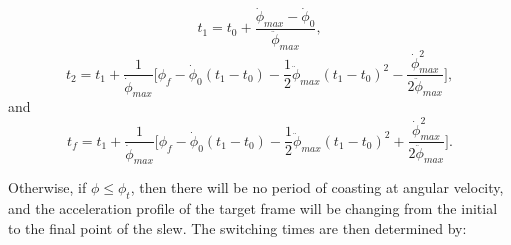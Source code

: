 \documentclass[journal ]{new-aiaa}
\begin{document}
\begin{equation}\label{t1cons}
t_1=t_0+\frac{\dot{\phi}_{max}-\dot{\phi}_0}{\ddot{\phi}_{max}},
\end{equation}
\begin{equation}\label{t2cons}
t_2=t_1+\frac{1}{\dot{\phi}_{max}}\Big[ \phi_f-\dot{\phi}_0(t_1-t_0)-\frac{1}{2}\ddot{\phi}_{max}(t_1-t_0)^2-\frac{\dot{\phi}_{max}^2}{2\ddot{\phi}_{max}} \Big],
\end{equation}
and
\begin{equation}\label{tfcons}
t_f=t_1+\frac{1}{\dot{\phi}_{max}}\Big[ \phi_f-\dot{\phi}_0(t_1-t_0)-\frac{1}{2}\ddot{\phi}_{max}(t_1-t_0)^2+\frac{\dot{\phi}_{max}^2}{2\ddot{\phi}_{max}} \Big].
\end{equation}

Otherwise, if $\phi \leq \phi_t$, then there will be no period of coasting at angular velocity, and the acceleration profile of the target frame will be changing from the initial to the final point of the slew. The switching times are then determined by: 
\end{document}
